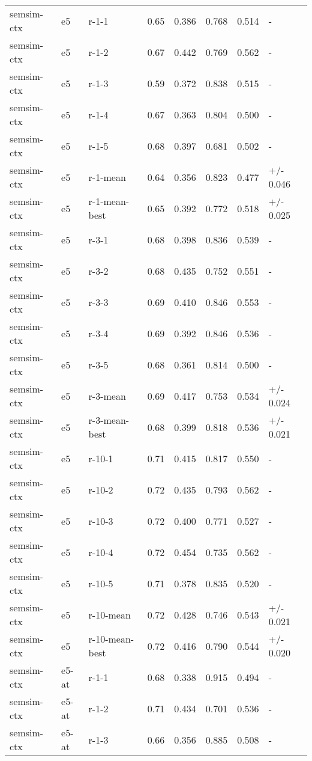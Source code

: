 \begin{tabular}{llllll}
\toprule
\midrule
semsim-ctx & e5 & r-1-1 & 0.65 & 0.386 & 0.768 & 0.514 & - \\
semsim-ctx & e5 & r-1-2 & 0.67 & 0.442 & 0.769 & 0.562 & - \\
semsim-ctx & e5 & r-1-3 & 0.59 & 0.372 & 0.838 & 0.515 & - \\
semsim-ctx & e5 & r-1-4 & 0.67 & 0.363 & 0.804 & 0.500 & - \\
semsim-ctx & e5 & r-1-5 & 0.68 & 0.397 & 0.681 & 0.502 & - \\
semsim-ctx & e5 & r-1-mean & 0.64 & 0.356 & 0.823 & 0.477 & +/- 0.046 \\
semsim-ctx & e5 & r-1-mean-best & 0.65 & 0.392 & 0.772 & 0.518 & +/- 0.025 \\
semsim-ctx & e5 & r-3-1 & 0.68 & 0.398 & 0.836 & 0.539 & - \\
semsim-ctx & e5 & r-3-2 & 0.68 & 0.435 & 0.752 & 0.551 & - \\
semsim-ctx & e5 & r-3-3 & 0.69 & 0.410 & 0.846 & 0.553 & - \\
semsim-ctx & e5 & r-3-4 & 0.69 & 0.392 & 0.846 & 0.536 & - \\
semsim-ctx & e5 & r-3-5 & 0.68 & 0.361 & 0.814 & 0.500 & - \\
semsim-ctx & e5 & r-3-mean & 0.69 & 0.417 & 0.753 & 0.534 & +/- 0.024 \\
semsim-ctx & e5 & r-3-mean-best & 0.68 & 0.399 & 0.818 & 0.536 & +/- 0.021 \\
semsim-ctx & e5 & r-10-1 & 0.71 & 0.415 & 0.817 & 0.550 & - \\
semsim-ctx & e5 & r-10-2 & 0.72 & 0.435 & 0.793 & 0.562 & - \\
semsim-ctx & e5 & r-10-3 & 0.72 & 0.400 & 0.771 & 0.527 & - \\
semsim-ctx & e5 & r-10-4 & 0.72 & 0.454 & 0.735 & 0.562 & - \\
semsim-ctx & e5 & r-10-5 & 0.71 & 0.378 & 0.835 & 0.520 & - \\
semsim-ctx & e5 & r-10-mean & 0.72 & 0.428 & 0.746 & 0.543 & +/- 0.021 \\
semsim-ctx & e5 & r-10-mean-best & 0.72 & 0.416 & 0.790 & 0.544 & +/- 0.020 \\
semsim-ctx & e5-at & r-1-1 & 0.68 & 0.338 & 0.915 & 0.494 & - \\
semsim-ctx & e5-at & r-1-2 & 0.71 & 0.434 & 0.701 & 0.536 & - \\
semsim-ctx & e5-at & r-1-3 & 0.66 & 0.356 & 0.885 & 0.508 & - \\

\end{tabular}
